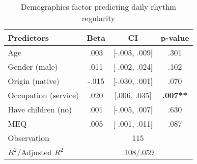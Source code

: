 
\begin{table}[!htpb]
\centering
\begin{tabular}{@{}lccc@{}}
\toprule
Predictors    & Beta & CI & p-value \\ \midrule
Age           & .003  & [-.003, .009]   & .301 \\
Gender (male)      & .011  & [-.002, .024]   & .102 \\
Origin (native)    & -.015 & [-.030, .001]   & .070 \\
Occupation (service) & .020  & [.006, .035]    & \textbf{.007**} \\
Have children (no) & .001  & [-.005, .007]   & .630 \\
MEQ            & .005  & [-.001, .011]   & .087 \\ \midrule
Observation  & \multicolumn{3}{c}{115} \\ 
$R^2$/Adjusted $R^2$ & \multicolumn{3}{c}{.108/.059} \\
\bottomrule
\end{tabular}
\caption{Demographics factor predicting daily rhythm regularity}
\label{your-table-label}
\end{table}
